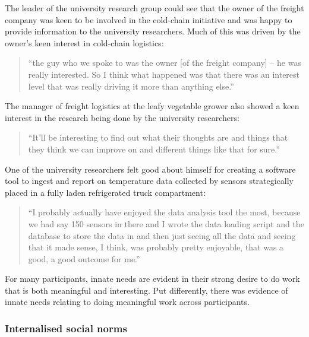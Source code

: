 The leader of the university research group could see that the owner of the freight company was keen to be involved in the cold-chain initiative and was happy to provide information to the university researchers. Much of this was driven by the owner's keen interest in cold-chain logistics:

\begin{quote}
\small
\enquote{the guy who we spoke to was the owner [of the freight company] -- he was really interested. So I think what happened was that there was an interest level that was really driving it more than anything else.} \\
\end{quote}

The manager of freight logistics at the leafy vegetable grower also showed a keen interest in the research being done by the university researchers:

\begin{quote}
\small
\enquote{It'll be interesting to find out what their thoughts are and things that they think we can improve on and different things like that for sure.} \\
\end{quote}

One of the university researchers felt good about himself for creating a software tool to ingest and report on temperature data collected by sensors strategically placed in a fully laden refrigerated truck compartment:

\begin{quote}
\small
\enquote{I probably actually have enjoyed the data analysis tool the most, because we had say 150 sensors in there and I wrote the data loading script and the database to store the data in and then just seeing all the data and seeing that it made sense, I think, was probably pretty enjoyable, that was a good, a good outcome for me.} \\
\end{quote}

For many participants, innate needs are evident in their strong desire to do work that is both meaningful and interesting. Put differently, there was evidence of innate needs relating to doing meaningful work across participants. 

\subsubsection{Internalised social norms}

